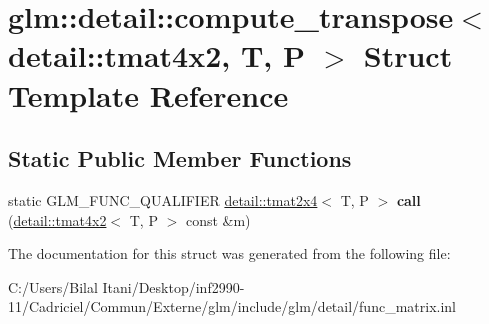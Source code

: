 \hypertarget{structglm_1_1detail_1_1compute__transpose_3_01detail_1_1tmat4x2_00_01_t_00_01_p_01_4}{}\section{glm\+:\+:detail\+:\+:compute\+\_\+transpose$<$ detail\+:\+:tmat4x2, T, P $>$ Struct Template Reference}
\label{structglm_1_1detail_1_1compute__transpose_3_01detail_1_1tmat4x2_00_01_t_00_01_p_01_4}
\subsection*{Static Public Member Functions}
\begin{DoxyCompactItemize}
\item 
static G\+L\+M\+\_\+\+F\+U\+N\+C\+\_\+\+Q\+U\+A\+L\+I\+F\+I\+ER \hyperlink{structglm_1_1detail_1_1tmat2x4}{detail\+::tmat2x4}$<$ T, P $>$ {\bfseries call} (\hyperlink{structglm_1_1detail_1_1tmat4x2}{detail\+::tmat4x2}$<$ T, P $>$ const \&m)\hypertarget{structglm_1_1detail_1_1compute__transpose_3_01detail_1_1tmat4x2_00_01_t_00_01_p_01_4_a345735a0a7bc0fa49d41693771b8c72e}{}\label{structglm_1_1detail_1_1compute__transpose_3_01detail_1_1tmat4x2_00_01_t_00_01_p_01_4_a345735a0a7bc0fa49d41693771b8c72e}

\end{DoxyCompactItemize}


The documentation for this struct was generated from the following file\+:\begin{DoxyCompactItemize}
\item 
C\+:/\+Users/\+Bilal Itani/\+Desktop/inf2990-\/11/\+Cadriciel/\+Commun/\+Externe/glm/include/glm/detail/func\+\_\+matrix.\+inl\end{DoxyCompactItemize}

